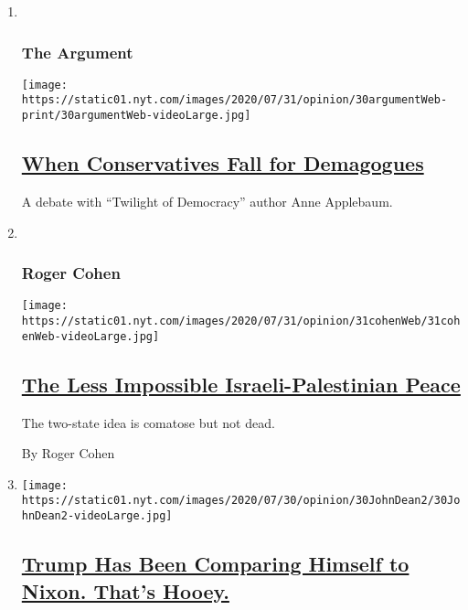 \begin{enumerate}
\def\labelenumi{\arabic{enumi}.}
\item ~
  \hypertarget{the-argument}{%
  \subsubsection{The Argument}\label{the-argument}}

  \texttt{[image: https://static01.nyt.com/images/2020/07/31/opinion/30argumentWeb-print/30argumentWeb-videoLarge.jpg]}

  \hypertarget{when-conservatives-fall-for-demagogues}{%
  \subsection{\texorpdfstring{\href{/2020/07/30/opinion/the-argument-authoritarianism-anne-applebaum.html}{When
  Conservatives Fall for
  Demagogues}}{When Conservatives Fall for Demagogues}}\label{when-conservatives-fall-for-demagogues}}

  A debate with ``Twilight of Democracy'' author Anne Applebaum.
\item ~
  \hypertarget{roger-cohen}{%
  \subsubsection{Roger Cohen}\label{roger-cohen}}

  \texttt{[image: https://static01.nyt.com/images/2020/07/31/opinion/31cohenWeb/31cohenWeb-videoLarge.jpg]}

  \hypertarget{the-less-impossible-israeli-palestinian-peace}{%
  \subsection{\texorpdfstring{\href{/2020/07/31/opinion/israeli-palestinian-peace.html}{The
  Less Impossible Israeli-Palestinian
  Peace}}{The Less Impossible Israeli-Palestinian Peace}}\label{the-less-impossible-israeli-palestinian-peace}}

  The two-state idea is comatose but not dead.

  By Roger Cohen
\item
  \texttt{[image: https://static01.nyt.com/images/2020/07/30/opinion/30JohnDean2/30JohnDean2-videoLarge.jpg]}

  \hypertarget{trump-has-been-comparing-himself-to-nixon-thats-hooey}{%
  \subsection{\texorpdfstring{\href{/2020/07/31/opinion/trump-nixon-authoritarianism.html}{Trump
  Has Been Comparing Himself to Nixon. That's
  Hooey.}}{Trump Has Been Comparing Himself to Nixon. That's Hooey.}}\label{trump-has-been-comparing-himself-to-nixon-thats-hooey}}


\end{enumerate}
